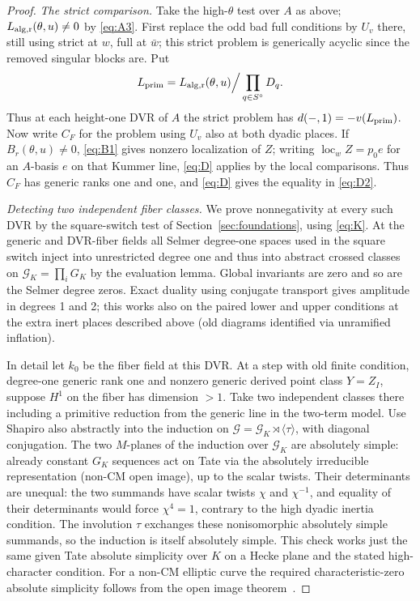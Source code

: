 \begin{proof}
\smallskip\noindent\emph{The strict comparison.}
Take the high-\(\theta\) test over \(A\) as above; \(L_{\rm alg,r}(\theta,u)\ne0\) by \eqref{eq:A3}. First replace the odd bad full conditions by \(U_v\) there, still using strict at \(w\), full at \(\bar w\); this strict problem is generically acyclic since the removed singular blocks are. Put
\[
       L_{\rm prim}= L_{\rm alg,r}(\theta,u)\Big/\prod_{q\in S^\circ}D_q .
\]
Thus at each height-one DVR of \(A\) the strict problem has \(d(-,1)=-v(L_{\rm prim})\). Now write \(C_F\) for the problem using \(U_v\) also at both dyadic places. If \(B_r(\theta,u)\ne0\), \eqref{eq:B1} gives nonzero localization of \(Z\); writing \(\operatorname{loc}_w Z=p_0 e\) for an \(A\)-basis \(e\) on that Kummer line, \eqref{eq:D} applies by the local comparisons. Thus \(C_F\) has generic ranks one and one, and \eqref{eq:D} gives the equality in \eqref{eq:D2}.

\smallskip\noindent\emph{Detecting two independent fiber classes.}
We prove nonnegativity at every such DVR by the square-switch test of Section~\ref{sec:foundations}, using \eqref{eq:K}. At the generic and DVR-fiber fields all Selmer degree-one spaces used in the square switch inject into unrestricted degree one and thus into abstract crossed classes on \(\mathcal G_K=\prod_i G_K\) by the evaluation lemma. Global invariants are zero and so are the Selmer degree zeros. Exact duality using conjugate transport gives amplitude in degrees 1 and 2; this works also on the paired lower and upper conditions at the extra inert places described above (old diagrams identified via unramified inflation).

In detail let \(k_0\) be the fiber field at this DVR. At a step with old finite condition, degree-one generic rank one and nonzero generic derived point class \(Y=Z_I\), suppose \(H^1\) on the fiber has dimension \(>1\). Take two independent classes there including a primitive reduction from the generic line in the two-term model. Use Shapiro also abstractly into the induction on \(\mathcal G=\mathcal G_K\rtimes\langle\tau\rangle\), with diagonal conjugation. The two \(M\)-planes of the induction over \(\mathcal G_K\) are absolutely simple: already constant \(G_K\) sequences act on Tate via the absolutely irreducible representation (non-CM open image), up to the scalar twists. Their determinants are unequal: the two summands have scalar twists \(\chi\) and \(\chi^{-1}\), and equality of their determinants would force \(\chi^4=1\), contrary to the high dyadic inertia condition. The involution \(\tau\) exchanges these nonisomorphic absolutely simple summands, so the induction is itself absolutely simple. This check works just the same given Tate absolute simplicity over \(K\) on a Hecke plane and the stated high-character condition. For a non-CM elliptic curve the required characteristic-zero absolute simplicity follows from the open image theorem~\cite{Serre72}.


\end{proof}
